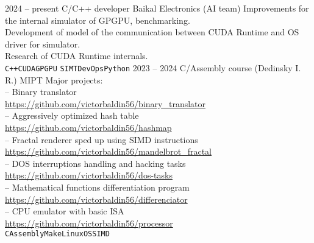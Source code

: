 \documentclass[9pt]{developercv} %
\begin{document}
\begin{entrylist}
        \entry
                {2024 -- present}
                {C/C++ developer}
                {Baikal Electronics (AI team)}
                {Improvements for the internal simulator of GPGPU, benchmarking.\\
                 Development of model of the communication between CUDA Runtime and OS driver for simulator.\\
                 Research of CUDA Runtime internals.\\
                  \texttt{C++}\slashsep\texttt{CUDA}\slashsep\texttt{GPGPU}
                  \slashsep\texttt{SIMT}\slashsep\texttt{DevOps}\slashsep\texttt{Python}}
        \entry
                {2023 -- 2024}
                {C/Assembly course (Dedinsky I. R.)}
                {MIPT}
                {Major projects:\\
                 -- Binary translator\\
                 \url{https://github.com/victorbaldin56/binary_translator}\\
                 -- Aggressively optimized hash table\\
                 \url{https://github.com/victorbaldin56/hashmap}\\
                 -- Fractal renderer sped up using SIMD instructions\\
                 \url{https://github.com/victorbaldin56/mandelbrot_fractal}\\
                 -- DOS interruptions handling and hacking tasks\\
                 \url{https://github.com/victorbaldin56/dos-tasks}\\
                 -- Mathematical functions differentiation program\\
                 \url{https://github.com/victorbaldin56/differenciator}\\
                 -- CPU emulator with basic ISA\\
                 \url{https://github.com/victorbaldin56/processor}\\
                 \texttt{C}\slashsep\texttt{Assembly}\slashsep\texttt{Make}\slashsep\texttt{Linux}\slashsep\texttt{OS}\slashsep\texttt{SIMD}}

\end{entrylist}
\end{document}

